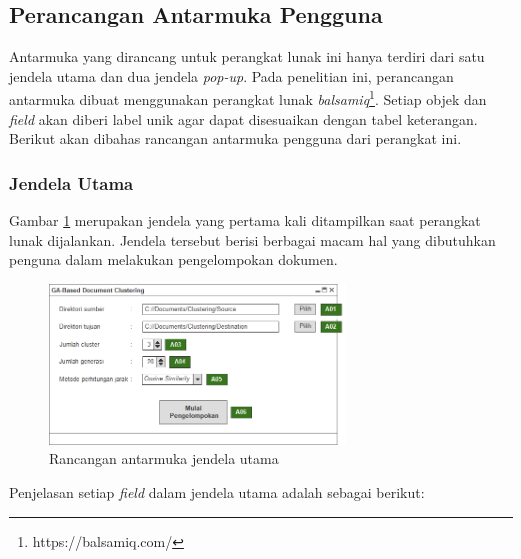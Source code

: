 \documentclass[a4paper,twoside]{article}
\begin{document}
\begin{enumerate}
\newpage

\subsection*{Perancangan Antarmuka Pengguna}
Antarmuka yang dirancang untuk perangkat lunak ini hanya terdiri dari satu jendela utama dan dua jendela \textit{pop-up}. Pada penelitian ini, perancangan antarmuka dibuat menggunakan perangkat lunak \textit{balsamiq}\footnote{https://balsamiq.com/}. Setiap objek dan \textit{field} akan diberi label unik agar dapat disesuaikan dengan tabel keterangan. Berikut akan dibahas rancangan antarmuka pengguna dari perangkat ini.

\subsubsection*{Jendela Utama}
Gambar \ref{fig:UIUtama} merupakan jendela yang pertama kali ditampilkan saat perangkat lunak dijalankan. Jendela tersebut berisi berbagai macam hal yang dibutuhkan penguna dalam melakukan pengelompokan dokumen. 

\begin{figure}[h]
	\begin{center}
		\includegraphics[width=0.7\textwidth]{UI/Main}
		\caption{Rancangan antarmuka jendela utama}
		\label{fig:UIUtama}
	\end{center}
\end{figure}

Penjelasan setiap \textit{field} dalam jendela utama adalah sebagai berikut:


\end{enumerate}
\end{document}
